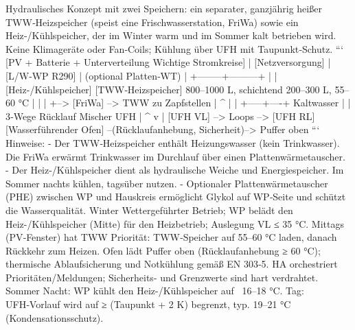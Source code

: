 \markdownRendererDocumentBegin
\markdownRendererSectionBegin
{}\markdownRendererInterblockSeparator
{}Hydraulisches Konzept mit zwei Speichern: ein separater, ganzjährig heißer TWW‑Heizspeicher (speist eine Frischwasserstation, FriWa) sowie ein Heiz‑/Kühlspeicher, der im Winter warm und im Sommer kalt betrieben wird. Keine Klimageräte oder Fan‑Coils; Kühlung über UFH mit Taupunkt‑Schutz.\markdownRendererInterblockSeparator
{}\markdownRendererSectionBegin
{}\markdownRendererInterblockSeparator
{}``` [PV + Batterie + Unterverteilung Wichtige Stromkreise] | [Netzversorgung] | [L/W‑WP R290] | (optional Platten‑WT) | +--------+---------+ | | [Heiz-/Kühlspeicher]       [TWW‑Heizspeicher] 800–1000 L, schichtend 200–300 L, 55–60 °C | | | +--> [FriWa] --> TWW zu Zapfstellen | ^ | | +-----+----+ Kaltwasser | | 3‑Wege Rücklauf Mischer UFH | ^ v | [UFH VL] --> Loops --> [UFH RL]\markdownRendererInterblockSeparator
{}[Wasserführender Ofen] --(Rücklaufanhebung, Sicherheit)--> Puffer oben ```\markdownRendererInterblockSeparator
{}Hinweise: - Der TWW‑Heizspeicher enthält Heizungswasser (kein Trinkwasser). Die FriWa erwärmt Trinkwasser im Durchlauf über einen Plattenwärmetauscher. - Der Heiz-/Kühlspeicher dient als hydraulische Weiche und Energiespeicher. Im Sommer nachts kühlen, tagsüber nutzen. - Optionaler Plattenwärmetauscher (PHE) zwischen WP und Hauskreis ermöglicht Glykol auf WP‑Seite und schützt die Wasserqualität.\markdownRendererInterblockSeparator
{}
\markdownRendererSectionEnd \markdownRendererSectionBegin
{}\markdownRendererInterblockSeparator
{}\markdownRendererUlBegin
\markdownRendererUlItem Winter\markdownRendererUlItemEnd 
\markdownRendererUlItem Wettergeführter Betrieb; WP belädt den Heiz-/Kühlspeicher (Mitte) für den Heizbetrieb; Auslegung VL ≤ 35 °C.\markdownRendererUlItemEnd 
\markdownRendererUlItem Mittags (PV‑Fenster) hat TWW Priorität: TWW‑Speicher auf 55–60 °C laden, danach Rückkehr zum Heizen.\markdownRendererUlItemEnd 
\markdownRendererUlItem Ofen lädt Puffer oben (Rücklaufanhebung ≥ 60 °C); thermische Ablaufsicherung und Notkühlung gemäß EN 303‑5.\markdownRendererUlItemEnd 
\markdownRendererUlItem HA orchestriert Prioritäten/Meldungen; Sicherheits- und Grenzwerte sind hart verdrahtet.\markdownRendererUlItemEnd 
\markdownRendererUlItem Sommer\markdownRendererUlItemEnd 
\markdownRendererUlItem Nacht: WP kühlt den Heiz-/Kühlspeicher auf ~16–18 °C.\markdownRendererUlItemEnd 
\markdownRendererUlItem Tag: UFH‑Vorlauf wird auf ≥ (Taupunkt + 2 K) begrenzt, typ. 19–21 °C (Kondensationsschutz).\markdownRendererUlItemEnd 
